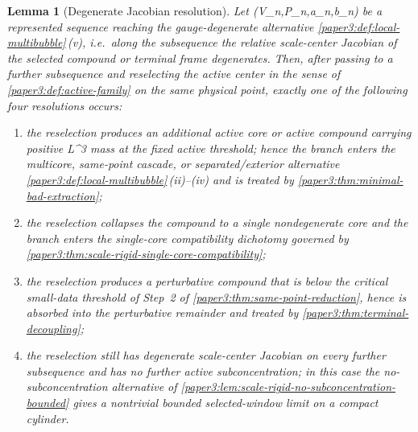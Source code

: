 \documentclass[11pt]{amsart}
\def\({}%
\def\){}%
\theoremstyle{plain}
\newtheorem{lemma}[lemma]{Lemma}
\theoremstyle{definition}
\theoremstyle{remark}
\begin{document}
\begin{lemma}[Degenerate Jacobian resolution]
\label{paper3:lem:scale-rigid-degenerate-jacobian}
Let \((V_n,P_n,a_n,b_n)\) be a represented sequence reaching the
gauge-degenerate alternative \cref{paper3:def:local-multibubble}\,(v),
i.e.\ along the subsequence the relative scale-center Jacobian of the
selected compound or terminal frame degenerates.  Then, after passing to a
further subsequence and reselecting the active center in the sense of
\cref{paper3:def:active-family} on the same physical point, exactly one of
the following four resolutions occurs:
\begin{enumerate}[label=\textup{(D\arabic*)}]
\item the reselection produces an additional active core or active compound
      carrying positive \(L^3\) mass at the fixed active threshold; hence the
      branch enters the multicore, same-point cascade, or separated/exterior
      alternative
      \cref{paper3:def:local-multibubble}\,(ii)--(iv) and is treated by
      \cref{paper3:thm:minimal-bad-extraction};
\item the reselection collapses the compound to a single nondegenerate core
      and the branch enters the single-core compatibility dichotomy governed by
      \cref{paper3:thm:scale-rigid-single-core-compatibility};
\item the reselection produces a perturbative compound that is below the
      critical small-data threshold of Step~2 of
      \cref{paper3:thm:same-point-reduction}, hence is absorbed into the
      perturbative remainder and treated by
      \cref{paper3:thm:terminal-decoupling};
\item the reselection still has degenerate scale-center Jacobian on every
      further subsequence and has no further active subconcentration; in this
      case the no-subconcentration alternative of
      \cref{paper3:lem:scale-rigid-no-subconcentration-bounded} gives a
      nontrivial bounded selected-window limit on a compact cylinder.
\end{enumerate}
\end{lemma}
\end{document}
